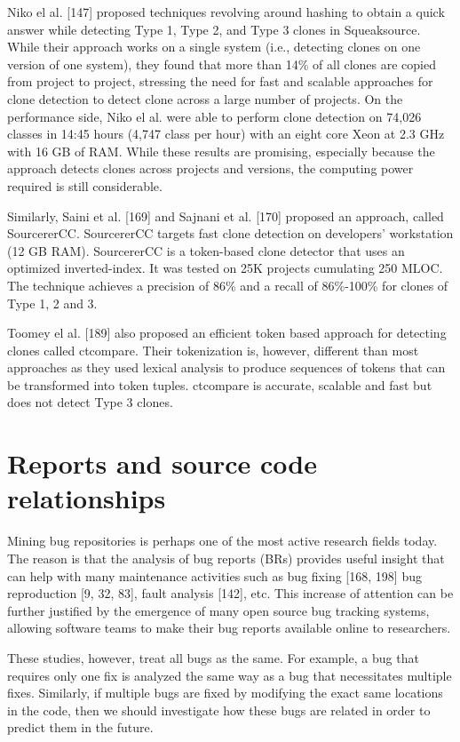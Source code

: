 \documentclass[12pt]{report}
\begin{document}
Niko el al. {[}147{]} proposed techniques revolving around hashing to
obtain a quick answer while detecting Type 1, Type 2, and Type 3 clones
in Squeaksource. While their approach works on a single system (i.e.,
detecting clones on one version of one system), they found that more
than 14\% of all clones are copied from project to project, stressing
the need for fast and scalable approaches for clone detection to detect
clone across a large number of projects. On the performance side, Niko
el al. were able to perform clone detection on 74,026 classes in 14:45
hours (4,747 class per hour) with an eight core Xeon at 2.3 GHz with 16
GB of RAM. While these results are promising, especially because the
approach detects clones across projects and versions, the computing
power required is still considerable.

Similarly, Saini et al. {[}169{]} and Sajnani et al. {[}170{]} proposed
an approach, called SourcererCC. SourcererCC targets fast clone
detection on developers' workstation (12 GB RAM). SourcererCC is a
token-based clone detector that uses an optimized inverted-index. It was
tested on 25K projects cumulating 250 MLOC. The technique achieves a
precision of 86\% and a recall of 86\%-100\% for clones of Type 1, 2 and
3.

Toomey el al. {[}189{]} also proposed an efficient token based approach
for detecting clones called ctcompare. Their tokenization is, however,
different than most approaches as they used lexical analysis to produce
sequences of tokens that can be transformed into token tuples. ctcompare
is accurate, scalable and fast but does not detect Type 3 clones.

\section{Reports and source code
relationships}\label{reports-and-source-code-relationships}

Mining bug repositories is perhaps one of the most active research
fields today. The reason is that the analysis of bug reports (BRs)
provides useful insight that can help with many maintenance activities
such as bug fixing {[}168, 198{]} bug reproduction {[}9, 32, 83{]},
fault analysis {[}142{]}, etc. This increase of attention can be further
justified by the emergence of many open source bug tracking systems,
allowing software teams to make their bug reports available online to
researchers.

These studies, however, treat all bugs as the same. For example, a bug
that requires only one fix is analyzed the same way as a bug that
necessitates multiple fixes. Similarly, if multiple bugs are fixed by
modifying the exact same locations in the code, then we should
investigate how these bugs are related in order to predict them in the
future.
\end{document}
